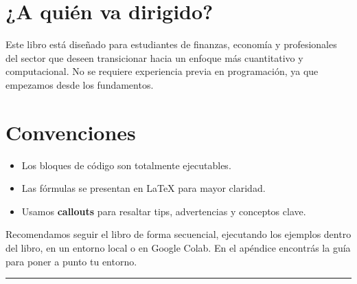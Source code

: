 \documentclass[
  spanish,
  letterpaper,
  DIV=11,
  numbers=noendperiod]{scrreprt}
\providecommand{\tightlist}{%
  \setlength{\itemsep}{0pt}\setlength{\parskip}{0pt}}
\begin{document}
\section*{¿A quién va dirigido?}\label{a-quiuxe9n-va-dirigido}


Este libro está diseñado para estudiantes de finanzas, economía y
profesionales del sector que deseen transicionar hacia un enfoque más
cuantitativo y computacional. No se requiere experiencia previa en
programación, ya que empezamos desde los fundamentos.

\section*{Convenciones}\label{convenciones}


\begin{itemize}
\tightlist
\item
  Los bloques de código son totalmente ejecutables.
\item
  Las fórmulas se presentan en LaTeX para mayor claridad.
\item
  Usamos \textbf{callouts} para resaltar tips, advertencias y conceptos
  clave.
\end{itemize}

\begin{tcolorbox}[enhanced jigsaw, bottomrule=.15mm, colback=white, breakable, left=2mm, colframe=quarto-callout-tip-color-frame, leftrule=.75mm, arc=.35mm, toprule=.15mm, rightrule=.15mm, opacityback=0]
\begin{minipage}[t]{5.5mm}
\textcolor{quarto-callout-tip-color}{\faLightbulb}
\end{minipage}%
\begin{minipage}[t]{\textwidth - 5.5mm}

Recomendamos seguir el libro de forma secuencial, ejecutando los
ejemplos dentro del libro, en un entorno local o en Google Colab. En el
apéndice encontrás la guía para poner a punto tu entorno.

\end{minipage}%
\end{tcolorbox}

\begin{center}\rule{0.5\linewidth}{0.5pt}\end{center}
\end{document}
